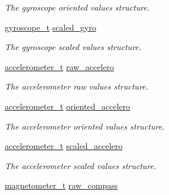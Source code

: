 \begin{DoxyCompactItemize}
\begin{DoxyCompactList}\small\item\em The gyroscope oriented values structure. \end{DoxyCompactList}\item 
\hypertarget{structimu__t_a8e3ea4998553c49eb9693044d4e7f989}{\hyperlink{structgyroscope__t}{gyroscope\+\_\+t} \hyperlink{structimu__t_a8e3ea4998553c49eb9693044d4e7f989}{scaled\+\_\+gyro}}\label{structimu__t_a8e3ea4998553c49eb9693044d4e7f989}

\begin{DoxyCompactList}\small\item\em The gyroscope scaled values structure. \end{DoxyCompactList}\item 
\hypertarget{structimu__t_a2df2d0e4c9370caf674fb3da64adde31}{\hyperlink{structaccelerometer__t}{accelerometer\+\_\+t} \hyperlink{structimu__t_a2df2d0e4c9370caf674fb3da64adde31}{raw\+\_\+accelero}}\label{structimu__t_a2df2d0e4c9370caf674fb3da64adde31}

\begin{DoxyCompactList}\small\item\em The accelerometer raw values structure. \end{DoxyCompactList}\item 
\hypertarget{structimu__t_a52e4abe6da7a20d77af88141c87fbcbc}{\hyperlink{structaccelerometer__t}{accelerometer\+\_\+t} \hyperlink{structimu__t_a52e4abe6da7a20d77af88141c87fbcbc}{oriented\+\_\+accelero}}\label{structimu__t_a52e4abe6da7a20d77af88141c87fbcbc}

\begin{DoxyCompactList}\small\item\em The accelerometer oriented values structure. \end{DoxyCompactList}\item 
\hypertarget{structimu__t_a380d3df7a9f49be462c08fb04c5e8edf}{\hyperlink{structaccelerometer__t}{accelerometer\+\_\+t} \hyperlink{structimu__t_a380d3df7a9f49be462c08fb04c5e8edf}{scaled\+\_\+accelero}}\label{structimu__t_a380d3df7a9f49be462c08fb04c5e8edf}

\begin{DoxyCompactList}\small\item\em The accelerometer scaled values structure. \end{DoxyCompactList}\item 
\hypertarget{structimu__t_ab77f86a1b6666e07316f9ddd417f8c4f}{\hyperlink{structmagnetometer__t}{magnetometer\+\_\+t} \hyperlink{structimu__t_ab77f86a1b6666e07316f9ddd417f8c4f}{raw\+\_\+compass}}\label{structimu__t_ab77f86a1b6666e07316f9ddd417f8c4f}


\end{DoxyCompactItemize}
